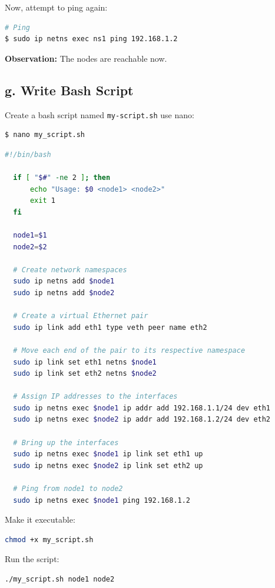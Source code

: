 \documentclass{report}
\begin{document}
Now, attempt to ping again:

\begin{lstlisting}[language=bash]
# Ping
$ sudo ip netns exec ns1 ping 192.168.1.2
\end{lstlisting}

\textbf{Observation:} The nodes are reachable now.

\subsection*{g. Write Bash Script}

Create a bash script named \texttt{my-script.sh} use nano:
\begin{lstlisting}[language=bash]
  $ nano my_script.sh
\end{lstlisting}

\begin{lstlisting}[language=bash]
  #!/bin/bash

  if [ "$#" -ne 2 ]; then
      echo "Usage: $0 <node1> <node2>"
      exit 1
  fi
  
  node1=$1
  node2=$2
  
  # Create network namespaces
  sudo ip netns add $node1
  sudo ip netns add $node2
  
  # Create a virtual Ethernet pair
  sudo ip link add eth1 type veth peer name eth2
  
  # Move each end of the pair to its respective namespace
  sudo ip link set eth1 netns $node1
  sudo ip link set eth2 netns $node2
  
  # Assign IP addresses to the interfaces
  sudo ip netns exec $node1 ip addr add 192.168.1.1/24 dev eth1
  sudo ip netns exec $node2 ip addr add 192.168.1.2/24 dev eth2
  
  # Bring up the interfaces
  sudo ip netns exec $node1 ip link set eth1 up
  sudo ip netns exec $node2 ip link set eth2 up
  
  # Ping from node1 to node2
  sudo ip netns exec $node1 ping 192.168.1.2
\end{lstlisting}

Make it executable:

\begin{lstlisting}[language=bash]
chmod +x my_script.sh
\end{lstlisting}

Run the script:

\begin{lstlisting}[language=bash]
./my_script.sh node1 node2
\end{lstlisting}
\end{document}
